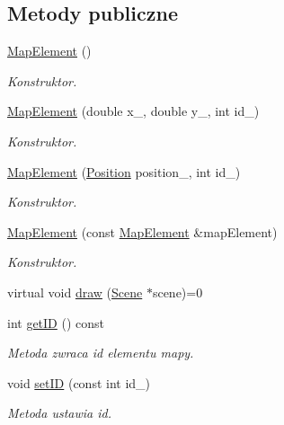 \subsection*{Metody publiczne}
\begin{DoxyCompactItemize}
\item 
\hyperlink{class_map_element_a1e6c2dadb01e42de3980f1cb9a5e316c}{Map\-Element} ()
\begin{DoxyCompactList}\small\item\em Konstruktor. \end{DoxyCompactList}\item 
\hyperlink{class_map_element_abb9461a82f67bd340559879d305d3c43}{Map\-Element} (double x\-\_\-, double y\-\_\-, int id\-\_\-)
\begin{DoxyCompactList}\small\item\em Konstruktor. \end{DoxyCompactList}\item 
\hyperlink{class_map_element_a6eb24cff5179f6919b426ad3654545f1}{Map\-Element} (\hyperlink{struct_position}{Position} position\-\_\-, int id\-\_\-)
\begin{DoxyCompactList}\small\item\em Konstruktor. \end{DoxyCompactList}\item 
\hyperlink{class_map_element_a4e692e2575a667c25213e59d9ac893f7}{Map\-Element} (const \hyperlink{class_map_element}{Map\-Element} \&map\-Element)
\begin{DoxyCompactList}\small\item\em Konstruktor. \end{DoxyCompactList}\item 
virtual void \hyperlink{class_map_element_aa76ca7443c4f6a6683f68f44909b90d3}{draw} (\hyperlink{class_scene}{Scene} $\ast$scene)=0
\item 
int \hyperlink{class_map_element_a4b0a0465fb8859aa91ddb888857167bb}{get\-I\-D} () const 
\begin{DoxyCompactList}\small\item\em Metoda zwraca id elementu mapy. \end{DoxyCompactList}\item 
void \hyperlink{class_map_element_a616d51f35aba2279c6df5415f8ee29d9}{set\-I\-D} (const int id\-\_\-)
\begin{DoxyCompactList}\small\item\em Metoda ustawia id. \end{DoxyCompactList}\end{DoxyCompactItemize}
